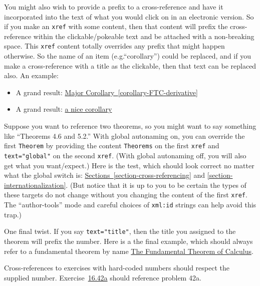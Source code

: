 \documentclass[10pt,]{article}
\theoremstyle{plain}
\theoremstyle{definition}
\theoremstyle{definition}
\theoremstyle{definition}
\theoremstyle{definition}
\theoremstyle{definition}
\theoremstyle{definition}
\numberwithin{equation}{section}
\begin{document}
%
\par
\hypertarget{p-525}{}%
You might also wish to provide a prefix to a cross-reference and have it incorporated into the text of what you would click on in an electronic version.  So if you make an \lstinline?xref? with some content, then that content will prefix the cross-reference within the clickable/pokeable text and be attached with a non-breaking space.  This \lstinline?xref? content totally overrides any prefix that might happen otherwise.  So the name of an item (e.g.\@ ``corollary'') could be replaced, and if you make a cross-reference with a title as the clickable, then that text can be replaced also.  An example:\leavevmode%
\begin{itemize}[label=\textbullet]
\item{}\hypertarget{p-526}{}%
A grand result: \hyperref[corollary-FTC-derivative]{Major Corollary~\ref{corollary-FTC-derivative}}%
\item{}\hypertarget{p-527}{}%
A grand result: \hyperref[corollary-FTC-derivative]{a nice corollary}%
\end{itemize}
%
\par
\hypertarget{p-528}{}%
Suppose you want to reference two theorems, so you might want to say something like ``Theorems 4.6 and 5.2.''  With global autonaming on, you can override the first \lstinline?Theorem? by providing the content \lstinline?Theorems? on the first \lstinline?xref? and \lstinline?text="global"? on the second \lstinline?xref?.  (With global autonaming off, you will also get what you want/expect.)   Here is the test, which should look correct no matter what the global switch is:  \hyperref[section-cross-referencing]{Sections~\ref{section-cross-referencing}} and \hyperref[section-internationalization]{\ref{section-internationalization}}.  (But notice that it is up to you to be certain the types of these targets do not change without you changing the content of the first \lstinline?xref?.  The ``author-tools'' mode and careful choices of \lstinline?xml:id? strings can help avoid this trap.)%
\par
\hypertarget{p-529}{}%
One final twist.  If you say \lstinline?text="title"?, then the title you assigned to the theorem will prefix the number.  Here is a the final example, which should always refer to a fundamental theorem by name \hyperref[theorem-FTC]{The Fundamental Theorem of Calculus}.%
\par
\hypertarget{p-530}{}%
Cross-references to exercises with hard-coded numbers should respect the supplied number.  Exercise~\hyperlink{exercise-with-hardcoded-number}{16.42a} should reference problem 42a.%
\end{document}
